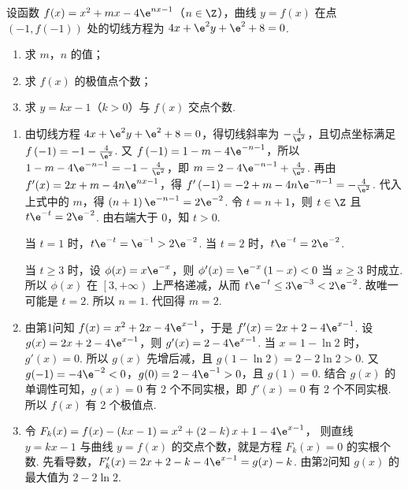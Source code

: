 \begin{problem}
设函数 \( f(x)=x^2+mx-4\e^{nx-1} \)（\( n\in \Z \)），曲线 \( y=f(x) \) 在点 \( \left( -1,f(-1) \right) \) 处的切线方程为 \( 4x+\e^2y+\e^2+8=0 \).

\begin{enumerate}
\item 求 \( m \)，\( n \) 的值；
\item 求 \( f(x) \) 的极值点个数；
\item 求 \( y=kx-1 \)（\( k>0 \)）与 \( f(x) \) 交点个数.
\end{enumerate}
\end{problem}

\begin{solution}
\begin{enumerate}
\item 由切线方程 \( 4x+\e^2y+\e^2+8=0 \)，得切线斜率为 \( -\frac{4}{\e^2} \)，且切点坐标满足 \( f\left( -1 \right)=-1-\frac{4}{\e^2} \).
又 \( f\left( -1 \right)=1-m-4\e^{-n-1} \)，所以 \( 1-m-4\e^{-n-1}=-1-\frac{4}{\e^2} \)，即 \( m=2-4\e^{-n-1}+\frac{4}{\e^2} \).
再由 \( f'(x)=2x+m-4n\e^{nx-1} \)，得 \( f'\left( -1 \right)=-2+m-4n\e^{-n-1}=-\frac{4}{\e^2} \). 代入上式中的 \( m \)，得 \( \left( n+1 \right)\e^{-n-1}=2\e^{-2} \). 令 \( t=n+1 \)，则 \( t\in \Z \) 且 \( t\e^{-t}=2\e^{-2} \).
由右端大于 0，知 \( t>0 \).

当 \( t=1 \) 时，\( t\e^{-t}=\e^{-1}>2\e^{-2} \). 当 \( t=2 \) 时，\( t\e^{-t}=2\e^{-2} \).

当 \( t\ge 3 \) 时，设 \( \phi(x)=x\e^{-x} \)，则 \( \phi'(x)=\e^{-x}\left( 1-x \right)<0 \)
当 \( x\ge 3 \) 时成立.
所以 \( \phi(x) \) 在 \( \left[ 3,+\infty \right) \) 上严格递减，从而 \( t\e^{-t}\le 3\e^{-3}<2\e^{-2} \).
故唯一可能是 \( t=2 \). 所以 \( n=1 \). 代回得 \( m=2 \).

\item 由第1问知 \( f(x)=x^2+2x-4\e^{x-1} \)，于是 \( f'(x)=2x+2-4\e^{x-1} \). 设 \( g(x)=2x+2-4\e^{x-1} \)，则 \( g'(x)=2-4\e^{x-1} \). 当 \( x=1-\ln 2 \) 时，\( g'(x)=0 \). 所以 \( g(x) \) 先增后减，且 \( g\left( 1-\ln 2 \right)=2-2\ln 2>0 \).
又 \( g(-1)=-4\e^{-2}<0 \)，\( g(0)=2-4\e^{-1}>0 \)，且 \( g(1)=0 \). 结合 \( g(x) \) 的单调性可知，\( g(x)=0 \) 有 2 个不同实根，即 \( f'(x)=0 \) 有 2 个不同实根. 所以 \( f(x) \) 有 2 个极值点.

\item 令 \( F_k(x)=f(x)-\left( kx-1 \right)=x^2+\left( 2-k \right)x+1-4\e^{x-1} \)，
则直线 \( y=kx-1 \) 与曲线 \( y=f(x) \) 的交点个数，就是方程 \( F_k(x)=0 \) 的实根个数.
先看导数，\( F_k'(x)=2x+2-k-4\e^{x-1}=g(x)-k \).
由第2问知 \( g(x) \) 的最大值为 \( 2-2\ln 2 \).


\end{enumerate}
\end{solution}
